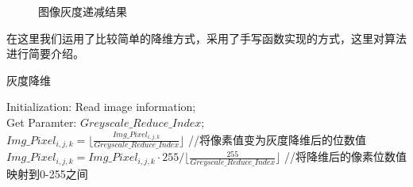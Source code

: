 \documentclass[UTF8]{ctexart}
\begin{document}
\begin{figure}[h!]
	\hspace{0.1in} 
	\hspace{0.1in} 
	\hspace{0.1in} 	
	\caption{图像灰度递减结果} 
	\label{greyscale_reduce_result} %
\end{figure}

在这里我们运用了比较简单的降维方式，采用了手写函数实现的方式，这里对算法进行简要介绍。

\begin{algorithm}[h!]
	\caption{灰度降维}
	\label{grayscale_reduce_algorithm}
	Initialization: Read image information; \\
	Get Paramter: $Greyscale\_Reduce\_Index$; \\
	{
		{
			{
				$Img\_Pixel_{i,j,k} = \biggl\lfloor\frac{Img\_Pixel_{i,j,k}}{Greyscale\_Reduce\_Index}\biggr\rfloor $ //将像素值变为灰度降维后的位数值 \\
				$Img\_Pixel_{i,j,k} = Img\_Pixel_{i,j,k} \cdot  255 / \biggl\lfloor\frac{255}{Greyscale\_Reduce\_Index}\biggr\rfloor  $ //将降维后的像素位数值映射到0-255之间
			}
		}
	}
\end{algorithm}
\end{document}
